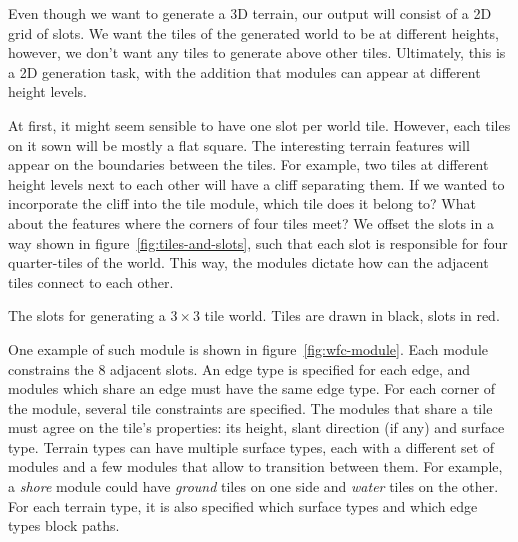 Even though we want to generate a 3D terrain, our output will consist of a 2D grid of slots.
We want the tiles of the generated world to be at different heights, however, we don't want any tiles to generate above other tiles.
Ultimately, this is a 2D generation task, with the addition that modules can appear at different height levels.

At first, it might seem sensible to have one slot per world tile.
However, each tiles on it sown will be mostly a flat square.
The interesting terrain features will appear on the boundaries between the tiles.
For example, two tiles at different height levels next to each other will have a cliff separating them.
If we wanted to incorporate the cliff into the tile module, which tile does it belong to?
What about the features where the corners of four tiles meet?
We offset the slots in a way shown in figure~\ref{fig:tiles-and-slots}, such that each slot is responsible for four quarter-tiles of the world.
This way, the modules dictate how can the adjacent tiles connect to each other.

\begin{center}
    \captionsetup{type=figure}
    \caption{The slots for generating a $3\times3$ tile world. Tiles are drawn in black, slots in red.}
    \label{fig:tiles-and-slots}
\end{center}

One example of such module is shown in figure~\ref{fig:wfc-module}.
Each module constrains the 8 adjacent slots.
An edge type is specified for each edge, and modules which share an edge must have the same edge type.
For each corner of the module, several tile constraints are specified.
The modules that share a tile must agree on the tile's properties: its height, slant direction (if any) and surface type.
Terrain types can have multiple surface types, each with a different set of modules and a few modules that allow to transition between them.
For example, a \emph{shore} module could have \emph{ground} tiles on one side and \emph{water} tiles on the other.
For each terrain type, it is also specified which surface types and which edge types block paths.

